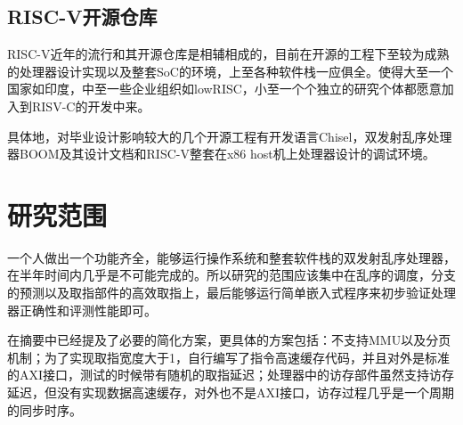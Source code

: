 	\subsection{RISC-V开源仓库}
	RISC-V近年的流行和其开源仓库是相辅相成的，目前在开源的工程下至较为成熟的处理器设计实现以及整套SoC的环境，上至各种软件栈一应俱全。使得大至一个国家如印度，中至一些企业组织如lowRISC，小至一个个独立的研究个体都愿意加入到RISV-C的开发中来。
	
	具体地，对毕业设计影响较大的几个开源工程有开发语言Chisel，双发射乱序处理器BOOM及其设计文档和RISC-V整套在x86 host机上处理器设计的调试环境。
	
	\section{研究范围}
	
	一个人做出一个功能齐全，能够运行操作系统和整套软件栈的双发射乱序处理器，在半年时间内几乎是不可能完成的。所以研究的范围应该集中在乱序的调度，分支的预测以及取指部件的高效取指上，最后能够运行简单嵌入式程序来初步验证处理器正确性和评测性能即可。
	
	在摘要中已经提及了必要的简化方案，更具体的方案包括：不支持MMU以及分页机制；为了实现取指宽度大于1，自行编写了指令高速缓存代码，并且对外是标准的AXI接口，测试的时候带有随机的取指延迟；处理器中的访存部件虽然支持访存延迟，但没有实现数据高速缓存，对外也不是AXI接口，访存过程几乎是一个周期的同步时序。
	